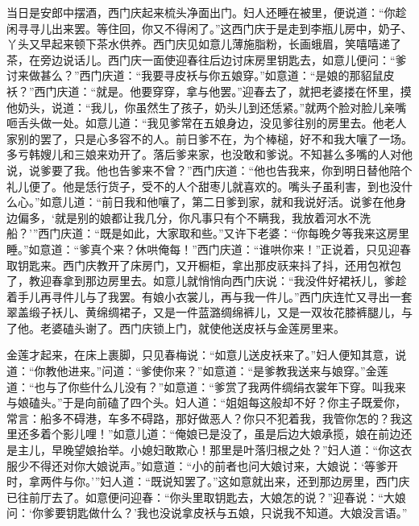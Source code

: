 当日是安郎中摆酒，西门庆起来梳头净面出门。妇人还睡在被里，便说道：“你趁闲寻寻儿出来罢。等住回，你又不得闲了。”这西门庆于是走到李瓶儿房中，奶子、丫头又早起来顿下茶水供养。西门庆见如意儿薄施脂粉，长画蛾眉，笑嘻嘻递了茶，在旁边说话儿。西门庆一面使迎春往后边讨床房里钥匙去，如意儿便问：“爹讨来做甚么？”西门庆道：“我要寻皮袄与你五娘穿。”如意道：“是娘的那貂鼠皮袄？”西门庆道：“就是。他要穿穿，拿与他罢。”迎春去了，就把老婆搂在怀里，摸他奶头，说道：“我儿，你虽然生了孩子，奶头儿到还恁紧。”就两个脸对脸儿亲嘴咂舌头做一处。如意儿道：“我见爹常在五娘身边，没见爹往别的房里去。他老人家别的罢了，只是心多容不的人。前日爹不在，为个棒槌，好不和我大嚷了一场。多亏韩嫂儿和三娘来劝开了。落后爹来家，也没敢和爹说。不知甚么多嘴的人对他说，说爹要了我。他也告爹来不曾？”西门庆道：“他也告我来，你到明日替他陪个礼儿便了。他是恁行货子，受不的人个甜枣儿就喜欢的。嘴头子虽利害，到也没什么心。”如意儿道：“前日我和他嚷了，第二日爹到家，就和我说好活。说爹在他身边偏多，‘就是别的娘都让我几分，你凡事只有个不瞒我，我放着河水不洗船？’”西门庆道：“既是如此，大家取和些。”又许下老婆：“你每晚夕等我来这房里睡。”如意道：“爹真个来？休哄俺每！”西门庆道：“谁哄你来！”正说着，只见迎春取钥匙来。西门庆教开了床房门，又开橱柜，拿出那皮祆来抖了抖，还用包袱包了，教迎春拿到那边房里去。如意儿就悄悄向西门庆说：“我没件好裙袄儿，爹趁着手儿再寻件儿与了我罢。有娘小衣裳儿，再与我一件儿。”西门庆连忙又寻出一套翠盖缎子袄儿、黄绵绸裙子，又是一件蓝潞绸绵裤儿，又是一双妆花膝裤腿儿，与了他。老婆磕头谢了。西门庆锁上门，就使他送皮袄与金莲房里来。

金莲才起来，在床上裹脚，只见春梅说：“如意儿送皮袄来了。”妇人便知其意，说道：“你教他进来。”问道：“爹使你来？”如意道：“是爹教我送来与娘穿。”金莲道：“也与了你些什么儿没有？”如意道：“爹赏了我两件绸绢衣裳年下穿。叫我来与娘磕头。”于是向前磕了四个头。妇人道：“姐姐每这般却不好？你主子既爱你，常言：船多不碍港，车多不碍路，那好做恶人？你只不犯着我，我管你怎的？我这里还多着个影儿哩！”如意儿道：“俺娘已是没了，虽是后边大娘承揽，娘在前边还是主儿，早晚望娘抬举。小媳妇敢欺心！那里是叶落归根之处？”妇人道：“你这衣服少不得还对你大娘说声。”如意道：“小的前者也问大娘讨来，大娘说：‘等爹开时，拿两件与你。’”妇人道：“既说知罢了。”这如意就出来，还到那边房里，西门庆已往前厅去了。如意便问迎春：“你头里取钥匙去，大娘怎的说？”迎春说：“大娘问：‘你爹要钥匙做什么？’我也没说拿皮袄与五娘，只说我不知道。大娘没言语。”

